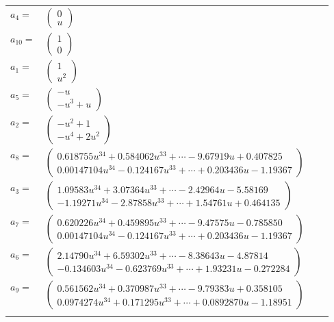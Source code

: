 \documentclass[1p]{elsarticle_modified}
\theoremstyle{definition}
\begin{document}
\begin{tabular}{m{7pt} m{180pt} m{7pt} m{180pt} }
\flushright $a_{4}=$&$\begin{pmatrix}0\\u\end{pmatrix}$ \\
\flushright $a_{10}=$&$\begin{pmatrix}1\\0\end{pmatrix}$ \\
\flushright $a_{1}=$&$\begin{pmatrix}1\\u^2\end{pmatrix}$ \\
\flushright $a_{5}=$&$\begin{pmatrix}- u\\- u^3+u\end{pmatrix}$ \\
\flushright $a_{2}=$&$\begin{pmatrix}- u^2+1\\- u^4+2 u^2\end{pmatrix}$ \\
\flushright $a_{8}=$&$\begin{pmatrix}0.618755 u^{34}+0.584062 u^{33}+\cdots-9.67919 u+0.407825\\0.00147104 u^{34}-0.124167 u^{33}+\cdots+0.203436 u-1.19367\end{pmatrix}$ \\
\flushright $a_{3}=$&$\begin{pmatrix}1.09583 u^{34}+3.07364 u^{33}+\cdots-2.42964 u-5.58169\\-1.19271 u^{34}-2.87858 u^{33}+\cdots+1.54761 u+0.464135\end{pmatrix}$ \\
\flushright $a_{7}=$&$\begin{pmatrix}0.620226 u^{34}+0.459895 u^{33}+\cdots-9.47575 u-0.785850\\0.00147104 u^{34}-0.124167 u^{33}+\cdots+0.203436 u-1.19367\end{pmatrix}$ \\
\flushright $a_{6}=$&$\begin{pmatrix}2.14790 u^{34}+6.59302 u^{33}+\cdots-8.38643 u-4.87814\\-0.134603 u^{34}-0.623769 u^{33}+\cdots+1.93231 u-0.272284\end{pmatrix}$ \\
\flushright $a_{9}=$&$\begin{pmatrix}0.561562 u^{34}+0.370987 u^{33}+\cdots-9.79383 u+0.358105\\0.0974274 u^{34}+0.171295 u^{33}+\cdots+0.0892870 u-1.18951\end{pmatrix}$\\&\end{tabular}
\end{document}

